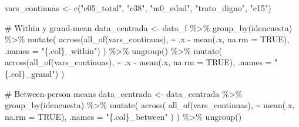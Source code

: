 \documentclass[
  spanish,
  a4paper,
  oneside]{scrbook}
\newenvironment{Shaded}{\begin{snugshade}}{\end{snugshade}}
\newcommand{\AttributeTok}[1]{\textcolor[rgb]{0.40,0.45,0.13}{#1}}
\newcommand{\CommentTok}[1]{\textcolor[rgb]{0.37,0.37,0.37}{#1}}
\newcommand{\ConstantTok}[1]{\textcolor[rgb]{0.56,0.35,0.01}{#1}}
\newcommand{\FunctionTok}[1]{\textcolor[rgb]{0.28,0.35,0.67}{#1}}
\newcommand{\NormalTok}[1]{\textcolor[rgb]{0.00,0.23,0.31}{#1}}
\newcommand{\OtherTok}[1]{\textcolor[rgb]{0.00,0.23,0.31}{#1}}
\newcommand{\SpecialCharTok}[1]{\textcolor[rgb]{0.37,0.37,0.37}{#1}}
\newcommand{\StringTok}[1]{\textcolor[rgb]{0.13,0.47,0.30}{#1}}
\begin{document}
\begin{Shaded}
\begin{Highlighting}[]
\NormalTok{vars\_continuas }\OtherTok{\textless{}{-}} \FunctionTok{c}\NormalTok{(}\StringTok{"c05\_total"}\NormalTok{, }\StringTok{"c38"}\NormalTok{, }\StringTok{"m0\_edad"}\NormalTok{, }\StringTok{"trato\_digno"}\NormalTok{, }\StringTok{"c15"}\NormalTok{)}

\CommentTok{\# Within y grand{-}mean}
\NormalTok{data\_centrada }\OtherTok{\textless{}{-}}\NormalTok{ data\_f }\SpecialCharTok{\%\textgreater{}\%}
  \FunctionTok{group\_by}\NormalTok{(idencuesta) }\SpecialCharTok{\%\textgreater{}\%}
  \FunctionTok{mutate}\NormalTok{(}
    \FunctionTok{across}\NormalTok{(}\FunctionTok{all\_of}\NormalTok{(vars\_continuas),}
           \SpecialCharTok{\textasciitilde{}}\NormalTok{ .x }\SpecialCharTok{{-}} \FunctionTok{mean}\NormalTok{(.x, }\AttributeTok{na.rm =} \ConstantTok{TRUE}\NormalTok{),}
           \AttributeTok{.names =} \StringTok{"\{.col\}\_within"}\NormalTok{)}
\NormalTok{  ) }\SpecialCharTok{\%\textgreater{}\%}
  \FunctionTok{ungroup}\NormalTok{() }\SpecialCharTok{\%\textgreater{}\%}
  \FunctionTok{mutate}\NormalTok{(}
    \FunctionTok{across}\NormalTok{(}\FunctionTok{all\_of}\NormalTok{(vars\_continuas),}
           \SpecialCharTok{\textasciitilde{}}\NormalTok{ .x }\SpecialCharTok{{-}} \FunctionTok{mean}\NormalTok{(.x, }\AttributeTok{na.rm =} \ConstantTok{TRUE}\NormalTok{),}
           \AttributeTok{.names =} \StringTok{"\{.col\}\_grand"}\NormalTok{)}
\NormalTok{  )}

\CommentTok{\# Between{-}person means}
\NormalTok{data\_centrada }\OtherTok{\textless{}{-}}\NormalTok{ data\_centrada }\SpecialCharTok{\%\textgreater{}\%}
  \FunctionTok{group\_by}\NormalTok{(idencuesta) }\SpecialCharTok{\%\textgreater{}\%}
  \FunctionTok{mutate}\NormalTok{(}
    \FunctionTok{across}\NormalTok{(}
      \FunctionTok{all\_of}\NormalTok{(vars\_continuas),}
      \SpecialCharTok{\textasciitilde{}} \FunctionTok{mean}\NormalTok{(.x, }\AttributeTok{na.rm =} \ConstantTok{TRUE}\NormalTok{),}
      \AttributeTok{.names =} \StringTok{"\{.col\}\_between"}
\NormalTok{    )}
\NormalTok{  ) }\SpecialCharTok{\%\textgreater{}\%}
  \FunctionTok{ungroup}\NormalTok{()}


\end{Highlighting}
\end{Shaded}
\end{document}
